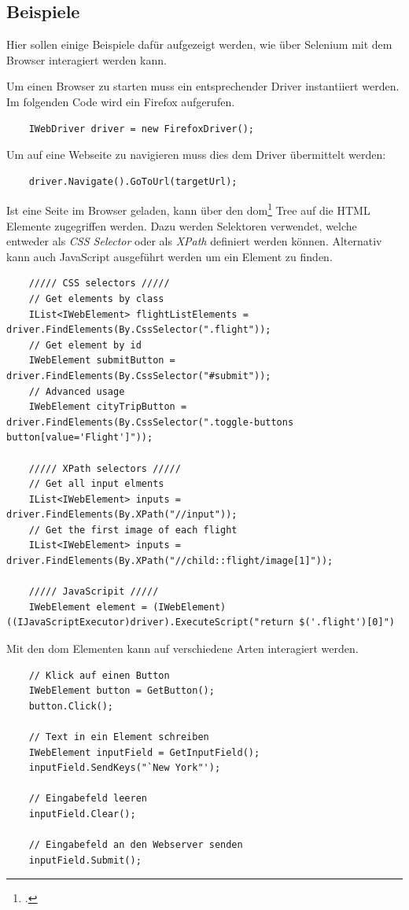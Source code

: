 \subsection{Beispiele}
Hier sollen einige Beispiele dafür aufgezeigt werden, wie über Selenium mit dem Browser interagiert werden kann.

Um einen Browser zu starten muss ein entsprechender Driver instantiiert werden. Im folgenden Code wird ein Firefox aufgerufen.
\begin{lstlisting}
	IWebDriver driver = new FirefoxDriver();
\end{lstlisting}

Um auf eine Webseite zu navigieren muss dies dem Driver übermittelt werden:
\begin{lstlisting}
	driver.Navigate().GoToUrl(targetUrl);
\end{lstlisting}

Ist eine Seite im Browser geladen, kann über den \gls{dom}\footcite{Document_Object_Model} Tree auf die HTML Elemente zugegriffen werden. Dazu werden Selektoren verwendet, welche entweder als \textit{CSS Selector} oder als \textit{XPath} definiert werden können. Alternativ kann auch JavaScript ausgeführt werden um ein Element zu finden.
\begin{lstlisting}
	///// CSS selectors /////
	// Get elements by class
	IList<IWebElement> flightListElements = driver.FindElements(By.CssSelector(".flight"));
	// Get element by id 
	IWebElement submitButton = driver.FindElements(By.CssSelector("#submit")); 
	// Advanced usage
	IWebElement cityTripButton = driver.FindElements(By.CssSelector(".toggle-buttons button[value='Flight']")); 
	
	///// XPath selectors /////
	// Get all input elments
	IList<IWebElement> inputs = driver.FindElements(By.XPath("//input")); 
	// Get the first image of each flight
	IList<IWebElement> inputs = driver.FindElements(By.XPath("//child::flight/image[1]")); 
	
	///// JavaScripit /////
	IWebElement element = (IWebElement) ((IJavaScriptExecutor)driver).ExecuteScript("return $('.flight')[0]")
\end{lstlisting}

Mit den \gls{dom} Elementen kann auf verschiedene Arten interagiert werden.

\begin{lstlisting}
	// Klick auf einen Button
	IWebElement button = GetButton();
	button.Click();
	
	// Text in ein Element schreiben
	IWebElement inputField = GetInputField();
	inputField.SendKeys("`New York"');
	
	// Eingabefeld leeren
	inputField.Clear();
	
	// Eingabefeld an den Webserver senden
	inputField.Submit();
\end{lstlisting}

